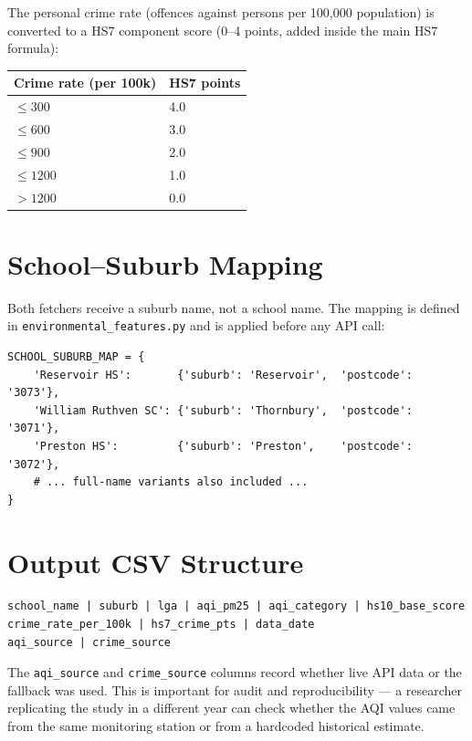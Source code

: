 \documentclass[11pt,a4paper,openany]{book}
\begin{document}
The personal crime rate (offences against persons per 100,000 population) is converted
to a HS7 component score (0--4 points, added inside the main HS7 formula):

\begin{center}
\begin{tabular}{C{4cm}C{3cm}}
\toprule
Crime rate (per 100k) & HS7 points \\
\midrule
$\leq 300$ & 4.0 \\
$\leq 600$ & 3.0 \\
$\leq 900$ & 2.0 \\
$\leq 1200$ & 1.0 \\
$> 1200$ & 0.0 \\
\bottomrule
\end{tabular}
\end{center}

\section{School--Suburb Mapping}

Both fetchers receive a suburb name, not a school name.  The mapping is defined
in \texttt{environmental\_features.py} and is applied before any API call:

\begin{lstlisting}[style=python, caption={School to suburb mapping.}]
SCHOOL_SUBURB_MAP = {
    'Reservoir HS':       {'suburb': 'Reservoir',  'postcode': '3073'},
    'William Ruthven SC': {'suburb': 'Thornbury',  'postcode': '3071'},
    'Preston HS':         {'suburb': 'Preston',    'postcode': '3072'},
    # ... full-name variants also included ...
}
\end{lstlisting}

\section{Output CSV Structure}

\begin{lstlisting}[style=text, caption={environmental\_features.csv columns.}]
school_name | suburb | lga | aqi_pm25 | aqi_category | hs10_base_score
crime_rate_per_100k | hs7_crime_pts | data_date
aqi_source | crime_source
\end{lstlisting}

The \texttt{aqi\_source} and \texttt{crime\_source} columns record whether live
API data or the fallback was used.  This is important for audit and reproducibility ---
a researcher replicating the study in a different year can check whether the AQI values
came from the same monitoring station or from a hardcoded historical estimate.
\end{document}
